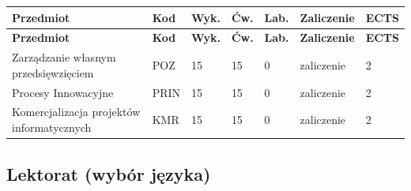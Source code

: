 \documentclass[12pt,a4paper]{article}
\newcommand{\thdrule}{\noalign{\global\setlength{\extrarowheight}{0pt}}}
\newcommand{\thdend}{\noalign{\global\setlength{\extrarowheight}{4pt}}}
\begin{document}
{\scriptsize
\begin{longtable}{m{5.5cm}m{0.8cm}m{1cm}m{1cm}m{1cm}m{1.7cm}m{0.7cm}}
\thdrule\toprule
\rowcolor{pjatkRed}
{\color{white}\footnotesize\textbf{\vphantom{Ag}Przedmiot}} & {\color{white}\footnotesize\textbf{\vphantom{Ag}Kod}} & {\color{white}\footnotesize\textbf{\vphantom{Ag}Wyk.}} & {\color{white}\footnotesize\textbf{\vphantom{Ag}Ćw.}} & {\color{white}\footnotesize\textbf{\vphantom{Ag}Lab.}} & {\color{white}\footnotesize\textbf{\vphantom{Ag}Zaliczenie}} & {\color{white}\footnotesize\textbf{\vphantom{Ag}ECTS}} \\
\midrule\thdend
\endfirsthead
\thdrule\toprule
\rowcolor{pjatkRed}
{\color{white}\footnotesize\textbf{\vphantom{Ag}Przedmiot}} & {\color{white}\footnotesize\textbf{\vphantom{Ag}Kod}} & {\color{white}\footnotesize\textbf{\vphantom{Ag}Wyk.}} & {\color{white}\footnotesize\textbf{\vphantom{Ag}Ćw.}} & {\color{white}\footnotesize\textbf{\vphantom{Ag}Lab.}} & {\color{white}\footnotesize\textbf{\vphantom{Ag}Zaliczenie}} & {\color{white}\footnotesize\textbf{\vphantom{Ag}ECTS}} \\
\midrule\thdend
\endhead
\rowcolor{tableRowLight} Zarządzanie własnym przedsięwzięciem & POZ & 15 & 15 & 0 & {\scriptsize zaliczenie} & 2 \\
\rowcolor{tableRowAlt} Procesy Innowacyjne & PRIN & 15 & 15 & 0 & {\scriptsize zaliczenie} & 2 \\
\rowcolor{tableRowLight} Komercjalizacja projektów informatycznych & KMR & 15 & 15 & 0 & {\scriptsize zaliczenie} & 2 \\
\bottomrule
\end{longtable}}

\subsection*{Lektorat (wybór języka)}
\end{document}
